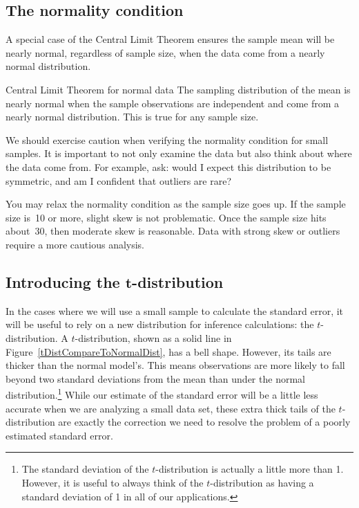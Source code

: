 \subsection{The normality condition}
\label{normalityCond}

A special case of the Central Limit Theorem ensures
the sample mean will be nearly normal,
regardless of sample size, when the data come from
a nearly normal distribution.

\begin{onebox}{Central Limit Theorem for normal data}
The sampling distribution of the mean is nearly normal when
the sample observations are independent and come from a nearly
normal distribution.
This is true for any sample size.
\end{onebox}

We should exercise caution when verifying the normality condition for small samples.
It is important to not only examine the data but also think about where the data come from.
For example, ask: would I expect this distribution to be symmetric, and am I confident that outliers are rare?

You may relax the normality condition as the sample size goes up.
If the sample size is~10 or more, slight skew is not problematic.
Once the sample size hits about~30, then moderate skew is
reasonable.
Data with strong skew or outliers require a more cautious analysis.


\subsection{Introducing the $\mathbf{t}$-distribution}
\label{introducingTheTDistribution}


In the cases where we will use a small sample to calculate the standard error, it will be useful to rely on a new distribution for inference calculations: the $t$-distribution. A $t$-distribution, shown as a solid line in Figure~\ref{tDistCompareToNormalDist}, has a bell shape. However, its tails are thicker than the normal model's. This means observations are more likely to fall beyond two standard deviations from the mean than under the normal distribution.\footnote{The standard deviation of the $t$-distribution is actually a little more than 1. However, it is useful to always think of the $t$-distribution as having a standard deviation of 1 in all of our applications.} While our estimate of the standard error will be a little less accurate when we are analyzing a small data set, these extra thick tails of the $t$-distribution are exactly the correction we need to resolve the problem of a poorly estimated standard error.

